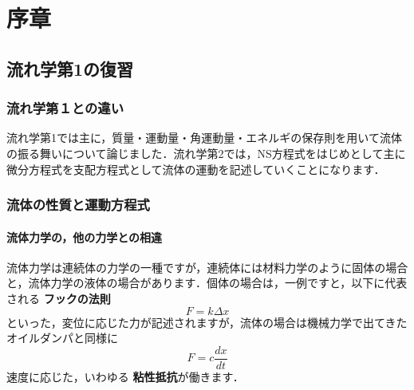 \documentclass[uplatex,12pt]{jsbook}
\newcommand{\strong}[1]{{\textbf{\color{violet} #1}}}
\begin{document}
	\chapter{序章}
	\section{流れ学第1の復習}
	\subsection{流れ学第１との違い}
	流れ学第1では主に，質量・運動量・角運動量・エネルギの保存則を用いて流体の振る舞いについて論じました．流れ学第2では，NS方程式をはじめとして主に微分方程式を支配方程式として流体の運動を記述していくことになります．
	
	\subsection{流体の性質と運動方程式}
	\subsubsection{流体力学の，他の力学との相違}
	流体力学は連続体の力学の一種ですが，連続体には材料力学のように固体の場合と，流体力学の液体の場合があります．個体の場合は，一例ですと，以下に代表される\strong{フックの法則}
	\begin{equation}
		F = k\Delta x
	\end{equation}
	といった，変位に応じた力が記述されますが，流体の場合は機械力学で出てきたオイルダンパと同様に
	\begin{equation}
		F = c \frac{dx}{dt}
	\end{equation}
	速度に応じた，いわゆる\strong{粘性抵抗}が働きます．
	
\end{document}
